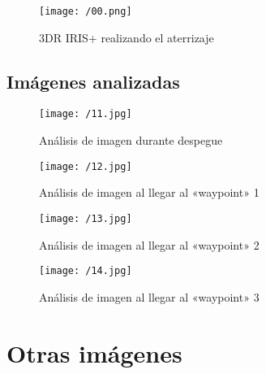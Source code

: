 \begin{figure}[!h]
\begin{center}
\texttt{[image: /00.png]}
\caption[3DR IRIS+ realizando el aterrizaje]{3DR IRIS+ realizando el aterrizaje}
\label{fig:despegue5}
\end{center}
\end{figure}

\clearpage

\subsection{Imágenes analizadas}

\begin{figure}[!h]
\begin{center}
\texttt{[image: /11.jpg]}
\caption[Análisis de imagen durante despegue]{Análisis de imagen durante despegue}
\label{fig:imagen11}
\end{center}
\end{figure}

\begin{figure}[!h]
\begin{center}
\texttt{[image: /12.jpg]}
\caption[Análisis de imagen al llegar al «waypoint» 1]{Análisis de imagen al llegar al «waypoint» 1}
\label{fig:imagen2}
\end{center}
\end{figure}

\begin{figure}[!h]
\begin{center}
\texttt{[image: /13.jpg]}
\caption[Análisis de imagen al llegar al «waypoint» 2]{Análisis de imagen al llegar al «waypoint» 2}
\label{fig:imagen3}
\end{center}
\end{figure}

\begin{figure}[!h]
\begin{center}
\texttt{[image: /14.jpg]}
\caption[Análisis de imagen al llegar al «waypoint» 3]{Análisis de imagen al llegar al «waypoint» 3}
\label{fig:imagen4}
\end{center}
\end{figure}

\clearpage

\section{Otras imágenes}

